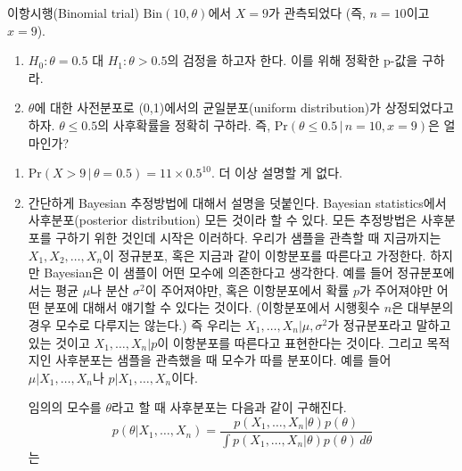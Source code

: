 \documentclass[answers]{exam}
\begin{document}
\newpage
{}
\begin{questions}
   \question
   이항시행(Binomial trial) $\mathrm{Bin}\left(10,\theta\right)$에서 $X=9$가 관측되었다 (즉, $n=10$이고 $x=9$).
   \begin{enumerate}
      \item $H_{0}:\theta=0.5$ 대 $H_{1}:\theta>0.5$의 검정을 하고자 한다. 이를 위해 정확한 p-값을 구하라.
      \item $\theta$에 대한 사전분포로 (0,1)에서의 균일분포(uniform distribution)가 상정되었다고 하자. $\theta \leq 0.5$의 사후확률을 정확히 구하라. 즉, $\mathrm{Pr}\left(\theta\leq0.5\,|\, n=10,x=9\right)$은 얼마인가?
   \end{enumerate}
   \begin{solution}
      \begin{enumerate}
         \item $\mathrm{Pr}\left(X> 9\,|\,\theta=0.5\right)=11\times0.5^{10}$. 더 이상 설명할 게 없다.
         \item 간단하게 Bayesian 추정방법에 대해서 설명을 덧붙인다. Bayesian statistics에서 사후분포(posterior distribution) 모든 것이라 할 수 있다. 모든 추정방법은 사후분포를 구하기 위한 것인데 시작은 이러하다. 우리가 샘플을 관측할 때 지금까지는 $X_{1},X_{2},\ldots ,X_{n}$이 정규분포, 혹은 지금과 같이 이항분포를 따른다고 가정한다. 하지만 Bayesian은 이 샘플이 어떤 모수에 의존한다고 생각한다. 예를 들어 정규분포에서는 평균 $\mu$나 분산 $\sigma^{2}$이 주어져야만, 혹은 이항분포에서 확률 $p$가 주어져야만 어떤 분포에 대해서 얘기할 수 있다는 것이다. (이항분포에서 시행횟수 $n$은 대부분의 경우 모수로 다루지는 않는다.) 즉 우리는 $X_{1},\ldots,X_{n}|\mu,\sigma^{2}$가 정규분포라고 말하고 있는 것이고 $X_{1},\ldots,X_{n}|p$이 이항분포를 따른다고 표현한다는 것이다. 그리고 목적지인 사후분포는 샘플을 관측했을 때 모수가 따를 분포이다. 예를 들어 $\mu|X_{1},\ldots, X_{n}$나 $p|X_{1},\ldots, X_{n}$이다. \par
         임의의 모수를 $\theta$라고 할 때 사후분포는 다음과 같이 구해진다.
         \begin{equation}
            p\left(\theta|X_{1},\ldots,X_{n}\right) = \dfrac{p\left(X_{1},\ldots,X_{n}|\theta\right)p\left(\theta\right)}{\int p\left(X_{1},\ldots,X_{n}|\theta\right)p\left(\theta\right)\, d\theta}
         \end{equation}는

\end{enumerate}
\end{solution}
\end{questions}
\end{document}
